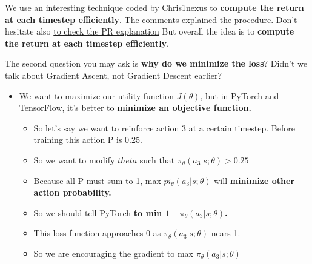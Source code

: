\documentclass[11pt,a4paper]{article}
\begin{document}
We use an interesting technique coded by \href{https://github.com/Chris1nexus}{Chris1nexus} to \textbf{compute the return at each timestep efficiently}. The comments explained the procedure. Don't hesitate also \href{https://github.com/huggingface/deep-rl-class/pull/95}{to check the PR explanation} But overall the idea is to \textbf{compute the return at each timestep efficiently}.

The second question you may ask is \textbf{why do we minimize the loss}? Didn't we talk about Gradient Ascent, not Gradient Descent earlier?

\begin{itemize}
\tightlist
\item
  We want to maximize our utility function \(J(\theta)\), but in PyTorch and TensorFlow, it's better to \textbf{minimize an objective function.}

  \begin{itemize}
  \tightlist
  \item
    So let's say we want to reinforce action 3 at a certain timestep. Before training this action P is 0.25.
  \item
    So we want to modify \(theta\) such that \(\pi_\theta(a_3|s; \theta) > 0.25\)
  \item
    Because all P must sum to 1, max \(pi_\theta(a_3|s; \theta)\) will \textbf{minimize other action probability.}
  \item
    So we should tell PyTorch \textbf{to min \(1 - \pi_\theta(a_3|s; \theta)\).}
  \item
    This loss function approaches 0 as \(\pi_\theta(a_3|s; \theta)\) nears 1.
  \item
    So we are encouraging the gradient to max \(\pi_\theta(a_3|s; \theta)\)
  \end{itemize}
\end{itemize}
\end{document}
